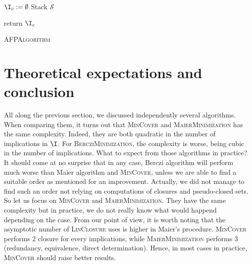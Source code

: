 \begin{algorithm}
	
	\BlankLine
	\BlankLine
	
	$\I_c := \emptyset$ \;
	Stack $\mathcal{S}$ \;
	
	\BlankLine
	

	return $\I_c$ \;
	
	
	\caption{\textsc{AFPAlgorithm}}
	\label{alg:AFP}
\end{algorithm}


\section{Theoretical expectations and conclusion}

All along the previous section, we discussed independently several algorithms.
When comparing them, it turns out that \textsc{MinCover} and 
\textsc{MaierMinimization} has the same complexity. Indeed, they are both 
quadratic in the number of implications in $\I$. For 
\textsc{BercziMinimization}, the complexity is worse, being cubic in the number 
of implications. What to expect from those algorithms in practice? It should 
come at no surprise that in any case, Berczi algorithm will perform much worse
than Maier algorithm and \textsc{MinCover}, unless we are able to find a 
suitable order as mentioned for an improvement. Actually, we did not manage to
find such an order not relying on computations of closures and pseudo-closed 
sets. So let us focus on \textsc{MinCover} and \textsc{MaierMinimization}. They
have the same complexity but in practice, we do not really know what would 
happend depending on the case. From our point of view, it is worth noting that
the asymptotic number of \textsc{LinClosure} uses is higher in Maier's 
procedure. \textsc{MinCover} performs 2 closure for every implications,
while \textsc{MaierMinimization} performs 3 (redundancy, equivalence, direct 
determination). Hence, in most cases in practice, \textsc{MinCover} should
raise better results.

